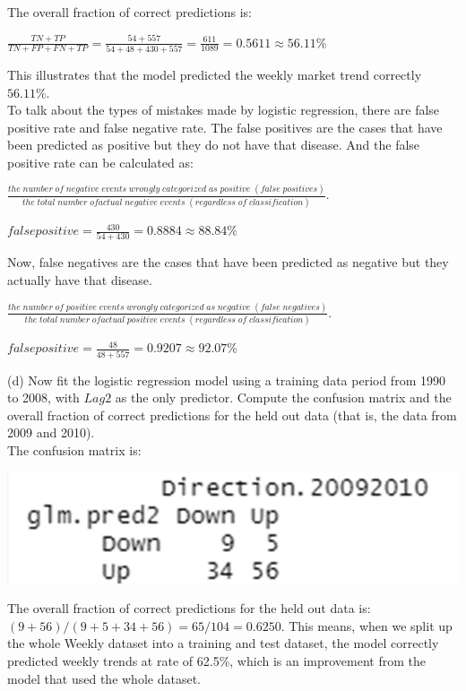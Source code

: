 \documentclass{article}
\begin{document}
The overall fraction of correct predictions is: 
\begin{center}
$\frac{TN + TP}{TN + FP + FN + TP} = \frac{54 + 557}{54 + 48 + 430 + 557} = \frac{611}{1089} = 0.5611 \approx 56.11\% $ \\
\end{center}
This illustrates that the model predicted the weekly market trend correctly $56.11\%$. \\
To talk about the types of mistakes made by logistic regression, there are false positive rate and false negative rate. The false positives are the cases that have been predicted as positive but they do not have that disease. And the false positive rate can be calculated as:
\begin{center}
$\frac{the \; number \; of \; negative \; events \; wrongly \; categorized \; as \; positive \; (false \; positives)}{the \; total \; number \; of actual \; negative \; events \; (regardless \; of \; classification)}$.

    $false positive = \frac{430}{54+430} = 0.8884 \approx 88.84\%$
\end{center}
Now, false negatives are the cases that have been predicted as negative but they actually have that disease.
\begin{center}
$\frac{the \; number \; of \; positive \; events \; wrongly \; categorized \; as \; negative \; (false \; negatives)}{the \; total \; number \; of actual \; positive \; events \; (regardless \; of \; classification)}$.

    $false positive = \frac{48}{48+557} = 0.9207 \approx 92.07\%$
\end{center}
(d) Now fit the logistic regression model using a training data period from 1990 to 2008, with $Lag2$ as the only predictor. Compute the confusion matrix and the overall fraction of correct predictions for the held out data (that is, the data from 2009 and 2010). \\
The confusion matrix is: 
\begin{center}
\includegraphics[scale = 0.46]{2.13.d.png} \\
\end{center}
The overall fraction of correct predictions for the held out data is: $(9 + 56)/(9 + 5 + 34 + 56) = 65/104 = 0.6250$. This means, when we split up the whole Weekly dataset into a training and test dataset, the model correctly predicted weekly trends at rate of 62.5\%, which is an improvement from the model that used the whole dataset. \\
\end{document}
